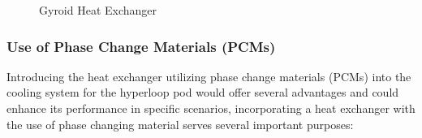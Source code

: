 \begin{figure}[ht]
  \centering
  \caption{Gyroid Heat Exchanger}
  \label{fig:HE}
\end{figure}


\subsubsection{Use of Phase Change Materials (PCMs)}
Introducing the heat exchanger utilizing phase change materials (PCMs) into the cooling system for the hyperloop pod would offer several advantages and could enhance its performance in specific scenarios, incorporating a heat exchanger with the use of phase changing material serves several important purposes:

